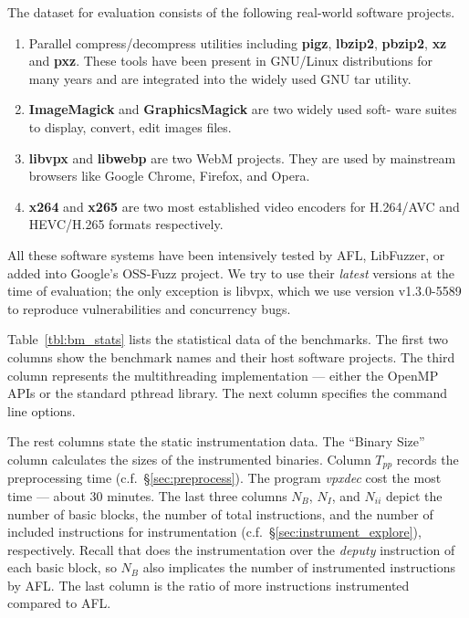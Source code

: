 The dataset for evaluation consists of the following real-world software projects.
\begin{enumerate}[1)]
    \item Parallel compress/decompress utilities including \textbf{pigz}, \textbf{lbzip2}, 
			\textbf{pbzip2}, \textbf{xz} and \textbf{pxz}. These tools have been present in 
			GNU/Linux distributions for many years and are integrated
into the widely used GNU \textsf{tar} utility.
    \item \textbf{ImageMagick} and \textbf{GraphicsMagick} are two widely used soft-
ware suites to display, convert, edit images files.
    \item \textbf{libvpx} and \textbf{libwebp} are two WebM projects. They are used by
mainstream browsers like Google Chrome, Firefox, and Opera.
    \item \textbf{x264} and \textbf{x265} are two most established video encoders for
H.264/AVC and HEVC/H.265 formats respectively.
\end{enumerate}

All these software systems have been intensively tested by AFL, LibFuzzer, or added into Google's OSS-Fuzz project. We try to use their \emph{latest} versions at the 
time of evaluation; the only exception is libvpx, which we use version v1.3.0-5589 to 
reproduce vulnerabilities and concurrency bugs.


Table~\ref{tbl:bm_stats} lists the statistical data of the benchmarks. The first two 
columns show the benchmark names and their host software projects. The third column
represents the multithreading implementation --- either the OpenMP~\cite{openmp} 
APIs or the standard pthread library. The next column specifies the command line options.


The rest columns state the static instrumentation data. The ``Binary Size'' column 
calculates the sizes of the instrumented binaries. Column $T_{pp}$ records the 
preprocessing time (c.f.~\S\ref{sec:preprocess}). The program \emph{vpxdec} cost the 
most time --- about 30 minutes. The last three columns $N_B$, $N_I$, and $N_{ii}$ 
depict the number of basic blocks, the number of total instructions, and the number 
of included instructions for \mtfuzz instrumentation (c.f.~\S\ref{sec:instrument_explore}), 
respectively. Recall that \AFLIns does the instrumentation over the \emph{deputy} instruction 
of each basic block, so $N_B$ also implicates the number of instrumented instructions by AFL. 
The last column is the ratio of more instructions \mtfuzz instrumented compared to AFL. 




